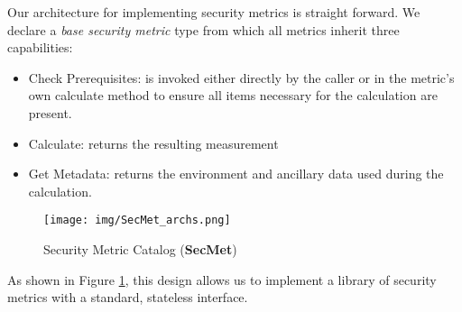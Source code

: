 Our architecture for implementing security metrics is straight forward. We declare a \textit{base security metric} type from which all metrics inherit three capabilities: 
\begin{itemize}
\item Check Prerequisites: is invoked either directly by the caller or in the metric's own calculate method to ensure all items necessary for the calculation are present.
\item Calculate: returns the resulting measurement
\item Get Metadata: returns the environment and ancillary data used during the calculation. 
\end{itemize}
 
\begin{minipage}{.45\linewidth}
\begin{figure}[H]

\texttt{[image: img/SecMet\_archs.png]}
\caption{Security Metric Catalog (\textbf{SecMet})}
\label{fig:automation:metric_arch}
\end{figure} 
\end{minipage}

As shown in Figure \ref{fig:automation:metric_arch}, this design allows us to implement a library of security metrics with a standard, stateless interface. 




